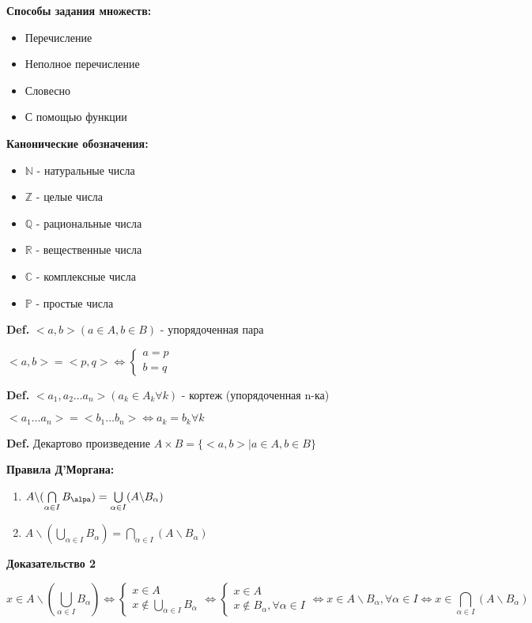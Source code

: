 \documentclass[14pt, letter paper]{article}
\begin{document}
\textbf{Способы задания множеств:}
\begin{itemize}
    \item Перечисление
    \item Неполное перечисление
    \item Словесно
    \item С помощью функции
\end{itemize}

\textbf{Канонические обозначения:}
\begin{itemize}
    \item $\mathds{N}$ - натуральные числа
    \item $\mathds{Z}$ - целые числа
    \item $\mathds{Q}$ - рациональные числа
    \item $\mathds{R}$ - вещественные числа
    \item $\mathds{C}$ - комплексные числа
    \item $\mathds{P}$ - простые числа
\end{itemize}

\textbf{Def.} $<a, b> (a \in A, b \in B)$ - упорядоченная пара \par $<a, b> = <p, q> \Leftrightarrow \begin{cases} a = p \\ b = q \end{cases}$

\textbf{Def.} $<a_1, a_2 \ldots a_n> (a_k \in A_k \forall k)$ - кортеж (упорядоченная n-ка)\par $<a_1 \ldots a_n> = <b_1 \ldots b_n> \Leftrightarrow a_k = b_k \forall k$

\textbf{Def.} Декартово произведение $A \times B = \{ <a, b> | a \in A, b \in B\}$

\textbf{Правила Д'Моргана:}
\begin{enumerate}
    \item $A \backslash (\bigcap\limits_{\alpha \in I} B_\alpa) = \bigcup\limits_{\alpha \in I} (A \backslash B_\alpha)$
    \item $A \backslash (\bigcup\limits_{\alpha \in I} B_\alpha) = \bigcap\limits_{\alpha \in I} (A \backslash B_\alpha)$
\end{enumerate}

\begin{center} \textbf{Доказательство 2} \end{center}
\[x \in A \backslash (\bigcup\limits_{\alpha \in I} B_\alpha) \Leftrightarrow \begin{cases} x \in A \\ x \notin \bigcup\limits_{\alpha \in I} B_\alpha \end{cases} \Leftrightarrow \begin{cases} x \in A \\ x \notin B_\alpha, \forall \alpha \in I \end{cases} \Leftrightarrow x \in A \backslash B_\alpha, \forall \alpha \in I \Leftrightarrow x \in \bigcap\limits_{\alpha \in I} (A \backslash B_\alpha)\]
\end{document}
